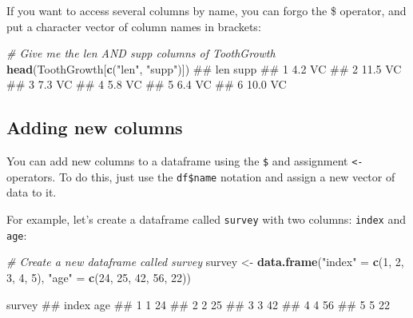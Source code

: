 \documentclass[]{book}
\newenvironment{Shaded}{\begin{snugshade}}{\end{snugshade}}
\newcommand{\KeywordTok}[1]{\textcolor[rgb]{0.13,0.29,0.53}{\textbf{{#1}}}}
\newcommand{\DecValTok}[1]{\textcolor[rgb]{0.00,0.00,0.81}{{#1}}}
\newcommand{\StringTok}[1]{\textcolor[rgb]{0.31,0.60,0.02}{{#1}}}
\newcommand{\CommentTok}[1]{\textcolor[rgb]{0.56,0.35,0.01}{\textit{{#1}}}}
\newcommand{\NormalTok}[1]{{#1}}
\theoremstyle{definition}
\theoremstyle{definition}
\theoremstyle{remark}
\begin{document}
\begin{Shaded}
\end{Shaded}

If you want to access several columns by name, you can forgo the \$
operator, and put a character vector of column names in brackets:

\begin{Shaded}
\begin{Highlighting}[]
\CommentTok{# Give me the len AND supp columns of ToothGrowth}
\KeywordTok{head}\NormalTok{(ToothGrowth[}\KeywordTok{c}\NormalTok{(}\StringTok{"len"}\NormalTok{, }\StringTok{"supp"}\NormalTok{)])}
\NormalTok{##    len supp}
\NormalTok{## 1  4.2   VC}
\NormalTok{## 2 11.5   VC}
\NormalTok{## 3  7.3   VC}
\NormalTok{## 4  5.8   VC}
\NormalTok{## 5  6.4   VC}
\NormalTok{## 6 10.0   VC}
\end{Highlighting}
\end{Shaded}

\subsection{Adding new columns}\label{adding-new-columns}

You can add new columns to a dataframe using the \texttt{\$} and
assignment \texttt{\textless{}-} operators. To do this, just use the
\texttt{df\$name} notation and assign a new vector of data to it.

For example, let's create a dataframe called \texttt{survey} with two
columns: \texttt{index} and \texttt{age}:

\begin{Shaded}
\begin{Highlighting}[]
\CommentTok{# Create a new dataframe called survey}
\NormalTok{survey <-}\StringTok{ }\KeywordTok{data.frame}\NormalTok{(}\StringTok{"index"} \NormalTok{=}\StringTok{ }\KeywordTok{c}\NormalTok{(}\DecValTok{1}\NormalTok{, }\DecValTok{2}\NormalTok{, }\DecValTok{3}\NormalTok{, }\DecValTok{4}\NormalTok{, }\DecValTok{5}\NormalTok{),}
                     \StringTok{"age"} \NormalTok{=}\StringTok{ }\KeywordTok{c}\NormalTok{(}\DecValTok{24}\NormalTok{, }\DecValTok{25}\NormalTok{, }\DecValTok{42}\NormalTok{, }\DecValTok{56}\NormalTok{, }\DecValTok{22}\NormalTok{))}

\NormalTok{survey}
\NormalTok{##   index age}
\NormalTok{## 1     1  24}
\NormalTok{## 2     2  25}
\NormalTok{## 3     3  42}
\NormalTok{## 4     4  56}
\NormalTok{## 5     5  22}
\end{Highlighting}
\end{Shaded}
\end{document}

